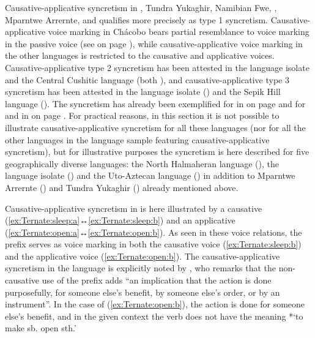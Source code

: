Causative-applicative syncretism in , Tundra Yukaghir, Namibian Fwe, , Mparntwe Arrernte, and  qualifies more precisely as type 1 syncretism. Causative-applicative voice marking in Chácobo bears partial resemblance to voice marking in the passive voice (see  on page \pageref{tab:ch5:caus-appl-pass}), while causative-applicative voice marking in the other languages is restricted to the causative and applicative voices. Causative-applicative type 2 syncretism has been attested in the language isolate  and the Central Cushitic language  (both ), and causative-applicative type 3 syncretism has been attested in the language isolate  () and the Sepik Hill language  (). The syncretism has already been exemplified for  in  on page \pageref{tab:ch3:type2-examples} and for  and  in  on page \pageref{tab:ch3:type3-examples}. For practical reasons, in this section it is not possible to illustrate causative-applicative syncretism for all these languages (nor for all the other languages in the language sample featuring causative-applicative syncretism), but for illustrative purposes the syncretism is here described for five geographically diverse languages: the North Halmaheran language  (), the language isolate  () and the Uto-Aztecan language  () in addition to Mparntwe Arrernte () and Tundra Yukaghir () already mentioned above.

Causative-applicative syncretism in  is here illustrated by a causative  (\ref{ex:Ternate:sleep:a}↔\ref{ex:Ternate:sleep:b}) and an applicative  (\ref{ex:Ternate:open:a}↔\ref{ex:Ternate:open:b}). As seen in these voice relations, the prefix  serves as voice marking in both the causative voice (\ref{ex:Ternate:sleep:b}) and the applicative voice (\ref{ex:Ternate:open:b}). The causative-applicative syncretism in the language is explicitly noted by \cite[132]{hayami-allen:2001}, who remarks that the non-causative use of the prefix adds “an implication that the action is done purposefully, for someone else’s benefit, by someone else’s order, or by an instrument”. In the case of (\ref{ex:Ternate:open:b}), the action is done for someone else’s benefit, and in the given context the verb  does not have the meaning *‘to make sb. open sth.’

